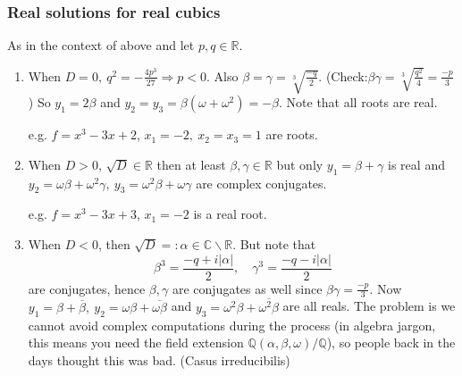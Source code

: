 \documentclass[a4paper]{article}
\newcommand{\Q}{\mathbb Q}
\newcommand{\C}{\mathbb C}
\newcommand{\R}{\mathbb R}
\theoremstyle{definition}
\begin{document}
\subsubsection{Real solutions for real cubics}
As in the context of above and let $p,q\in\R$.
\begin{enumerate}
\item When $D=0,\ q^2=-\frac{4p^3}{27} \Rightarrow p<0$. Also $\beta=\gamma=\sqrt[3]{\frac{-q}{2}}$. (Check:$\beta\gamma=\sqrt[3]{\frac{q^2}{4}}=\frac{-p}{3}$) So $y_1=2\beta$ and $y_2=y_3=\beta(\omega+\omega^2)=-\beta$. Note that all roots are real.

e.g. $f=x^3-3x+2$, $x_1=-2,\ x_2=x_3=1$ are roots.

\begin{center}
\end{center}

\item When $D>0$, $\sqrt D\in\R$ then at least $\beta,\gamma \in\R$ but only $y_1=\beta+\gamma$ is real and $y_2=\omega \beta+\omega^2\gamma,\ y_3=\omega^2\beta+\omega\gamma$ are complex conjugates.

e.g. $f=x^3-3x+3$, $x_1=-2$ is a real root.

\begin{center}
\end{center}

\item When $D<0$, then $\sqrt D=:\alpha \in \C\backslash\R$. But note that
\[
\beta^3=\frac{-q+i|\alpha|}{2},\quad \gamma^3=\frac{-q-i|\alpha|}{2}
\]
are conjugates, hence $\beta,\gamma$ are conjugates as well since $\beta\gamma=\frac{-p}{3}$. Now $y_1=\beta+\overline\beta,\ y_2=\omega\beta+\overline{\omega\beta}$ and $y_3=\omega^2\beta+\overline{\omega^2\beta}$ are all reals. The problem is we cannot avoid complex computations during the process (in algebra jargon, this means you need the field extension $\Q(\alpha,\beta,\omega)/\Q$), so people back in the days thought this was bad. (Casus irreducibilis)


\end{enumerate}
\end{document}
